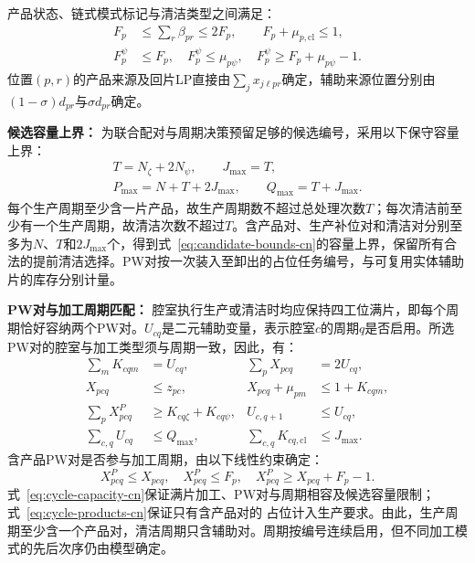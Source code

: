产品状态、链式模式标记与清洁类型之间满足：
\begin{equation}
\begin{aligned}
F_p&\le\sum_r\beta_{pr}\le2F_p,\qquad F_p+\mu_{p,\mathrm{cl}}\le1,\\
F_p^\psi&\le F_p,\quad F_p^\psi\le\mu_{p\psi},\quad
F_p^\psi\ge F_p+\mu_{p\psi}-1.
\end{aligned}
\label{eq:pair-type-cn}
\end{equation}
位置$(p,r)$的产品来源及回片LP直接由$\sum_jx_{j\ell pr}$确定，辅助来源位置分别由$(1-\sigma)d_{pr}$与$\sigma d_{pr}$确定。

\noindent\textbf{候选容量上界：}
为联合配对与周期决策预留足够的候选编号，采用以下保守容量上界：
\begin{equation}
\begin{gathered}
T=N_{\zeta}+2N_{\psi},\qquad J_{\max}=T,\\
P_{\max}=N+T+2J_{\max},\qquad Q_{\max}=T+J_{\max}.
\end{gathered}
\label{eq:candidate-bounds-cn}
\end{equation}
每个生产周期至少含一片产品，故生产周期数不超过总处理次数$T$；每次清洁前至少有一个生产周期，故清洁次数不超过$T$。含产品对、生产补位对和清洁对分别至多为$N$、$T$和$2J_{\max}$个，得到式~\eqref{eq:candidate-bounds-cn}的容量上界，保留所有合法的提前清洁选择。PW对按一次装入至卸出的占位任务编号，与可复用实体辅助片的库存分别计量。

\noindent\textbf{PW对与加工周期匹配：}
腔室执行生产或清洁时均应保持四工位满片，即每个周期恰好容纳两个PW对。$U_{cq}$是二元辅助变量，表示腔室$c$的周期$q$是否启用。所选
PW对的腔室与加工类型须与周期一致，因此，有：
\begin{equation}
\begin{aligned}
\sum_mK_{cqm}&=U_{cq}, &\sum_pX_{pcq}&=2U_{cq},\\
X_{pcq}&\le z_{pc}, &X_{pcq}+\mu_{pm}&\le1+K_{cqm},\\
\sum_pX^P_{pcq}&\ge K_{cq\zeta}+K_{cq\psi}, &U_{c,q+1}&\le U_{cq},\\
\sum_{c,q}U_{cq}&\le Q_{\max}, &\sum_{c,q}K_{cq,\mathrm{cl}}&\le J_{\max}.
\end{aligned}
\label{eq:cycle-capacity-cn}
\end{equation}
含产品PW对是否参与加工周期，由以下线性约束确定：
\begin{equation}
X^P_{pcq}\le X_{pcq},\quad X^P_{pcq}\le F_p,\quad
X^P_{pcq}\ge X_{pcq}+F_p-1.
\label{eq:cycle-products-cn}
\end{equation}
式~\eqref{eq:cycle-capacity-cn}保证满片加工、PW对与周期相容及候选容量限制；式~\eqref{eq:cycle-products-cn}保证只有含产品对的
占位计入生产要求。由此，生产周期至少含一个产品对，清洁周期只含辅助对。周期按编号连续启用，但不同加工模式的先后次序仍由模型确定。

